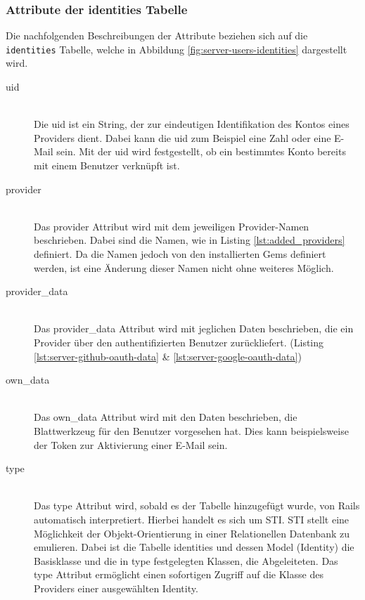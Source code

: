 \subsubsection*{Attribute der identities Tabelle}
Die nachfolgenden Beschreibungen der Attribute beziehen sich auf die \texttt{identities} Tabelle, welche in Abbildung \ref{fig:server-users-identities} dargestellt wird.
\begin{description}
	\item[uid]\hfill\\
	Die uid ist ein String, der zur eindeutigen Identifikation des Kontos eines Providers dient. Dabei kann die uid zum Beispiel eine Zahl oder eine E-Mail sein. Mit der uid wird festgestellt, ob ein bestimmtes Konto bereits mit einem Benutzer verknüpft ist.
	\item[provider]\hfill\\
	Das provider Attribut wird mit dem jeweiligen Provider-Namen beschrieben. Dabei sind die Namen, wie in Listing \ref{lst:added_providers} definiert. Da die Namen jedoch von den installierten Gems definiert werden, ist eine Änderung dieser Namen nicht ohne weiteres Möglich.
	\item[provider\_data]\hfill\\
	Das provider\_data Attribut wird mit jeglichen Daten beschrieben, die ein Provider über den authentifizierten Benutzer zurückliefert. (Listing \ref{lst:server-github-oauth-data} \& \ref{lst:server-google-oauth-data})

	\begin{minipage}{.42\textwidth}
		
	\end{minipage}\hfill
	\begin{minipage}{.42\textwidth}
		
	\end{minipage}

	\item[own\_data]\hfill\\
	Das own\_data Attribut wird mit den Daten beschrieben, die Blattwerkzeug für den Benutzer vorgesehen hat. Dies kann beispielsweise der Token zur Aktivierung einer E-Mail sein.
	\item[type]\hfill\\
	Das type Attribut wird, sobald es der Tabelle hinzugefügt wurde, von Rails automatisch interpretiert. Hierbei handelt es sich um \gls{STI}. \gls{STI} stellt eine Möglichkeit der Objekt-Orientierung in einer Relationellen Datenbank zu emulieren. Dabei ist die Tabelle identities und dessen Model (Identity) die Basisklasse und die in type festgelegten Klassen, die Abgeleiteten. Das type Attribut ermöglicht einen sofortigen Zugriff auf die Klasse des Providers einer ausgewählten Identity.
\end{description}

